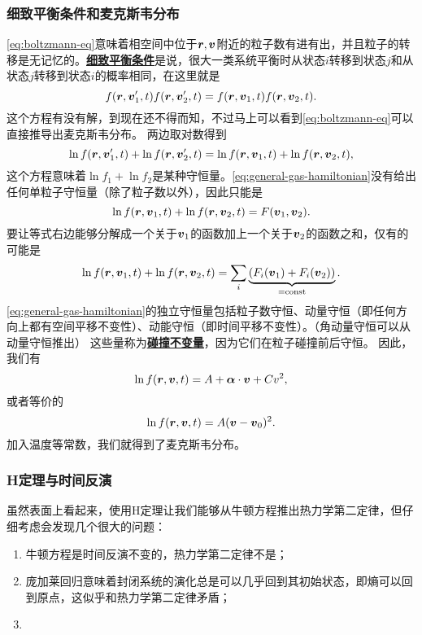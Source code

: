 \documentclass[hyperref, UTF8, a4paper]{ctexart}
\newcommand*{\const}{\mathrm{const}}
\newcommand{\concept}[1]{\underline{\textbf{#1}}}
\begin{document}
\subsubsection{细致平衡条件和麦克斯韦分布}

\eqref{eq:boltzmann-eq}意味着相空间中位于$\vb*{r}, \vb*{v}$附近的粒子数有进有出，并且粒子的转移是无记忆的。\concept{细致平衡条件}是说，很大一类系统平衡时从状态$i$转移到状态$j$和从状态$j$转移到状态$i$的概率相同，在这里就是
\begin{equation}
    f(\vb*{r}, \vb*{v}'_1, t) f(\vb*{r}, \vb*{v}'_{2}, t) = f(\vb*{r}, \vb*{v}_1, t) f(\vb*{r}, \vb*{v}_{2}, t).
\end{equation}
这个方程有没有解，到现在还不得而知，不过马上可以看到\eqref{eq:boltzmann-eq}可以直接推导出麦克斯韦分布。
两边取对数得到
\[
    \ln f(\vb*{r}, \vb*{v}'_1, t) + \ln f(\vb*{r}, \vb*{v}'_{2}, t) = \ln f(\vb*{r}, \vb*{v}_1, t) + \ln f(\vb*{r}, \vb*{v}_{2}, t),
\]
这个方程意味着$\ln f_1 + \ln f_2$是某种守恒量。\eqref{eq:general-gas-hamiltonian}没有给出任何单粒子守恒量（除了粒子数以外），因此只能是
\[
    \ln f(\vb*{r}, \vb*{v}_1, t) + \ln f(\vb*{r}, \vb*{v}_{2}, t) = F(\vb*{v}_1, \vb*{v}_2).
\]
要让等式右边能够分解成一个关于$\vb*{v}_1$的函数加上一个关于$\vb*{v}_2$的函数之和，仅有的可能是
\[
    \ln f(\vb*{r}, \vb*{v}_1, t) + \ln f(\vb*{r}, \vb*{v}_{2}, t) = \sum_i \underbrace{(F_i(\vb*{v}_1) + F_i(\vb*{v}_2))}_{=\const}.
\]
\eqref{eq:general-gas-hamiltonian}的独立守恒量包括粒子数守恒、动量守恒（即任何方向上都有空间平移不变性）、动能守恒（即时间平移不变性）。（角动量守恒可以从动量守恒推出）
这些量称为\concept{碰撞不变量}，因为它们在粒子碰撞前后守恒。
因此，我们有
\[
    \ln f(\vb*{r}, \vb*{v}, t) = A + \vb*{\alpha} \cdot \vb*{v} + C v^2,
\]
或者等价的
\[
    \ln f(\vb*{r}, \vb*{v}, t) = A (\vb*{v} - \vb*{v}_0)^2.
\]
加入温度等常数，我们就得到了麦克斯韦分布。

\subsubsection{H定理与时间反演}

虽然表面上看起来，使用H定理让我们能够从牛顿方程推出热力学第二定律，但仔细考虑会发现几个很大的问题：
\begin{enumerate}
    \item 牛顿方程是时间反演不变的，热力学第二定律不是；
    \item 庞加莱回归意味着封闭系统的演化总是可以几乎回到其初始状态，即熵可以回到原点，这似乎和热力学第二定律矛盾；
    \item 
\end{enumerate}
\end{document}
